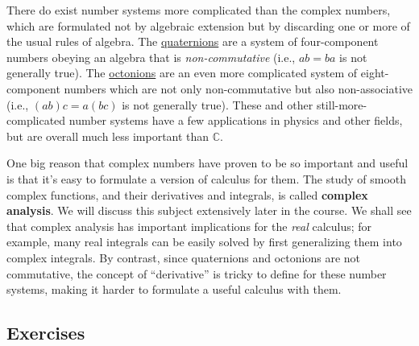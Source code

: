 \documentclass[10pt,a4paper]{article}
\begin{document}
There do exist number systems more complicated than the complex numbers,
which are formulated not by algebraic extension but by discarding one or
more of the usual rules of algebra. The
\href{https://en.wikipedia.org/wiki/Quaternion}{quaternions} are a
system of four-component numbers obeying an algebra that is
\emph{non-commutative} (i.e., $ab = ba$ is not generally true). The
\href{https://en.wikipedia.org/wiki/Octonion}{octonions} are an even
more complicated system of eight-component numbers which are not only
non-commutative but also non-associative (i.e., $(ab)c = a(bc)$ is not
generally true). These and other still-more-complicated number systems
have a few applications in physics and other fields, but are overall
much less important than $\mathbb{C}$.

One big reason that complex numbers have proven to be so important and
useful is that it's easy to formulate a version of calculus for them.
The study of smooth complex functions, and their derivatives and
integrals, is called \textbf{complex analysis}.  We will discuss this
subject extensively later in the course.  We shall see that complex
analysis has important implications for the \emph{real} calculus; for
example, many real integrals can be easily solved by first
generalizing them into complex integrals. By contrast, since
quaternions and octonions are not commutative, the concept of
``derivative'' is tricky to define for these number systems, making it
harder to formulate a useful calculus with them.

\subsection{Exercises}
\end{document}
